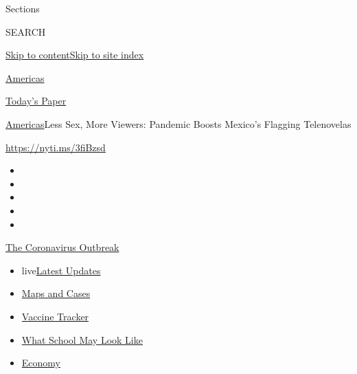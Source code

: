Sections

SEARCH

\protect\hyperlink{site-content}{Skip to
content}\protect\hyperlink{site-index}{Skip to site index}

\href{https://www.nytimes.com/section/world/americas}{Americas}

\href{https://myaccount.nytimes.com/auth/login?response_type=cookie\&client_id=vi}{}

\href{https://www.nytimes.com/section/todayspaper}{Today's Paper}

\href{/section/world/americas}{Americas}\textbar{}Less Sex, More
Viewers: Pandemic Boosts Mexico's Flagging Telenovelas

\url{https://nyti.ms/3fiBzsd}

\begin{itemize}
\item
\item
\item
\item
\item
\end{itemize}

\href{https://www.nytimes.com/news-event/coronavirus?action=click\&pgtype=Article\&state=default\&region=TOP_BANNER\&context=storylines_menu}{The
Coronavirus Outbreak}

\begin{itemize}
\tightlist
\item
  live\href{https://www.nytimes.com/2020/08/02/world/coronavirus-updates.html?action=click\&pgtype=Article\&state=default\&region=TOP_BANNER\&context=storylines_menu}{Latest
  Updates}
\item
  \href{https://www.nytimes.com/interactive/2020/us/coronavirus-us-cases.html?action=click\&pgtype=Article\&state=default\&region=TOP_BANNER\&context=storylines_menu}{Maps
  and Cases}
\item
  \href{https://www.nytimes.com/interactive/2020/science/coronavirus-vaccine-tracker.html?action=click\&pgtype=Article\&state=default\&region=TOP_BANNER\&context=storylines_menu}{Vaccine
  Tracker}
\item
  \href{https://www.nytimes.com/interactive/2020/07/29/us/schools-reopening-coronavirus.html?action=click\&pgtype=Article\&state=default\&region=TOP_BANNER\&context=storylines_menu}{What
  School May Look Like}
\item
  \href{https://www.nytimes.com/live/2020/07/31/business/stock-market-today-coronavirus?action=click\&pgtype=Article\&state=default\&region=TOP_BANNER\&context=storylines_menu}{Economy}
\end{itemize}

